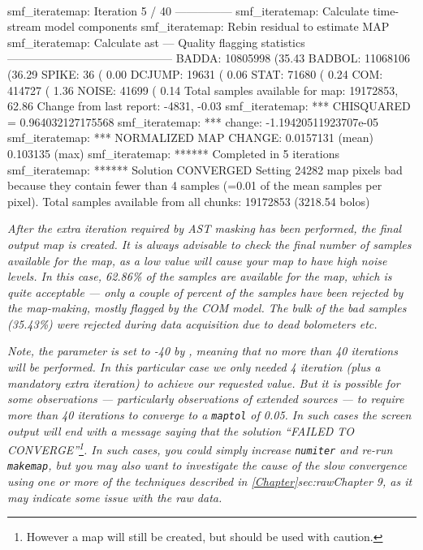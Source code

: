 \begin{terminalv}
~
\begin{terminalv}
smf_iteratemap: Iteration 5 / 40 ---------------
smf_iteratemap: Calculate time-stream model components
smf_iteratemap: Rebin residual to estimate MAP
smf_iteratemap: Calculate ast
--- Quality flagging statistics --------------------------------------------
 BADDA:   10805998 (35.43%
BADBOL:   11068106 (36.29%
 SPIKE:         36 ( 0.00%
DCJUMP:      19631 ( 0.06%
  STAT:      71680 ( 0.24%
   COM:     414727 ( 1.36%
 NOISE:      41699 ( 0.14%
Total samples available for map:   19172853, 62.86%
     Change from last report:      -4831, -0.03%
smf_iteratemap: *** CHISQUARED = 0.964032127175568
smf_iteratemap: *** change: -1.19420511923707e-05
smf_iteratemap: *** NORMALIZED MAP CHANGE: 0.0157131 (mean) 0.103135 (max)
smf_iteratemap: ****** Completed in 5 iterations
smf_iteratemap: ****** Solution CONVERGED
Setting 24282 map pixels bad because they contain fewer than 4 samples (=0.01
of the mean samples per pixel).
Total samples available from all chunks: 19172853 (3218.54 bolos)
\end{terminalv}

\emph{After the extra iteration required by AST masking has been
performed, the final output map is created. It is always advisable to
check the final number of samples available for the map, as a low value
will cause your map to have high noise levels. In this case, 62.86\% of
the samples are available for the map, which is quite acceptable --- only
a couple of percent of the samples have been rejected by the map-making,
mostly flagged by the COM model. The bulk of the bad samples (35.43\%)
were rejected during data acquisition due to dead bolometers \emph{etc}.}

\emph{Note, the  parameter is set to -40 by
\brightcompact, meaning that no more than 40 iterations will be
performed. In this particular case we only needed 4 iteration (plus a
mandatory extra iteration) to achieve
our requested  value. But it is possible for some
observations --- particularly observations of extended sources --- to
require more than 40 iterations to converge to a \texttt{maptol} of 0.05.
In such cases the screen output will end with a message saying that the
solution ``FAILED TO CONVERGE''\footnote{However a map will still be
created, but should be used with caution.}. In such cases, you \emph{could}
simply increase \texttt{numiter} and re-run \texttt{makemap}, but you may
also want to investigate the cause of the slow convergence using one or more
of the techniques described in \cref{Chapter}{sec:raw}{Chapter 9}, as it
may indicate some issue with the raw data.}


\end{terminalv}
